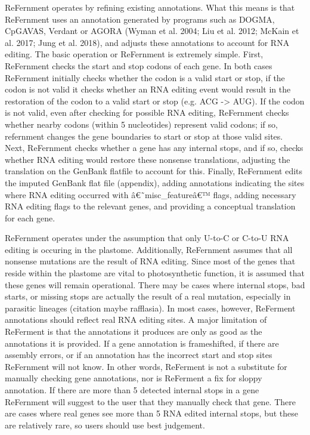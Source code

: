 \documentclass[]{article}
\begin{document}
ReFernment operates by refining existing annotations. What this means is
that ReFernment uses an annotation generated by programs such as DOGMA,
CpGAVAS, Verdant or AGORA (Wyman et al. 2004; Liu et al. 2012; McKain et
al. 2017; Jung et al. 2018), and adjusts these annotations to account
for RNA editing. The basic operation or ReFernment is extremely simple.
First, ReFernment checks the start and stop codons of each gene. In both
cases ReFernment initially checks whether the codon is a valid start or
stop, if the codon is not valid it checks whether an RNA editing event
would result in the restoration of the codon to a valid start or stop
(e.g. ACG -\textgreater{} AUG). If the codon is not valid, even after
checking for possible RNA editing, ReFernment checks whether nearby
codons (within 5 nucleotides) represent valid codons; if so, refernment
changes the gene boundaries to start or stop at those valid sites. Next,
ReFernment checks whether a gene has any internal stops, and if so,
checks whether RNA editing would restore these nonsense translations,
adjusting the translation on the GenBank flatfile to account for this.
Finally, ReFernment edits the imputed GenBank flat file (appendix),
adding annotations indicating the sites where RNA editing occurred with
â€˜misc\_featureâ€™ flags, adding necessary RNA editing flags to the
relevant genes, and providing a conceptual translation for each gene.

ReFernment operates under the assumption that only U-to-C or C-to-U RNA
editing is occuring in the plastome. Additionally, ReFernment assumes
that all nonsense mutations are the result of RNA editing. Since most of
the genes that reside within the plastome are vital to photosynthetic
function, it is assumed that these genes will remain operational. There
may be cases where internal stops, bad starts, or missing stops are
actually the result of a real mutation, especially in parasitic lineages
(citation maybe rafflasia). In most cases, however, ReFerment
annotations should reflect real RNA editing sites. A major limitation of
ReFerment is that the annotations it produces are only as good as the
annotations it is provided. If a gene annotation is frameshifted, if
there are assembly errors, or if an annotation has the incorrect start
and stop sites ReFernment will not know. In other words, ReFerment is
not a substitute for manually checking gene annotations, nor is
ReFerment a fix for sloppy annotation. If there are more than 5 detected
internal stops in a gene ReFernment will suggest to the user that they
manually check that gene. There are cases where real genes see more than
5 RNA edited internal stops, but these are relatively rare, so users
should use best judgement.
\end{document}
